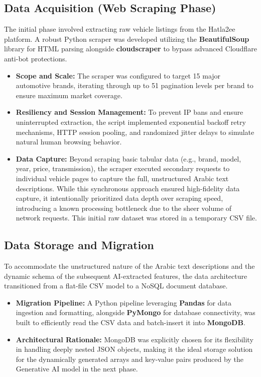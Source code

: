 \documentclass[12pt]{article}
\begin{document}
\subsection{Data Acquisition (Web Scraping Phase)}
The initial phase involved extracting raw vehicle listings from the Hatla2ee platform. A robust Python scraper was developed utilizing the \textbf{BeautifulSoup} library for HTML parsing alongside \textbf{cloudscraper} to bypass advanced Cloudflare anti-bot protections.
\begin{itemize}
    \item \textbf{Scope and Scale:} The scraper was configured to target 15 major automotive brands, iterating through up to 51 pagination levels per brand to ensure maximum market coverage.
    \item \textbf{Resiliency and Session Management:} To prevent IP bans and ensure uninterrupted extraction, the script implemented exponential backoff retry mechanisms, HTTP session pooling, and randomized jitter delays to simulate natural human browsing behavior.
    \item \textbf{Data Capture:} Beyond scraping basic tabular data (e.g., brand, model, year, price, transmission), the scraper executed secondary requests to individual vehicle pages to capture the full, unstructured Arabic text descriptions. While this synchronous approach ensured high-fidelity data capture, it intentionally prioritized data depth over scraping speed, introducing a known processing bottleneck due to the sheer volume of network requests. This initial raw dataset was stored in a temporary CSV file.
\end{itemize}

\newpage
\subsection{Data Storage and Migration}
To accommodate the unstructured nature of the Arabic text descriptions and the dynamic schema of the subsequent AI-extracted features, the data architecture transitioned from a flat-file CSV model to a NoSQL document database.
\begin{itemize}
    \item \textbf{Migration Pipeline:} A Python pipeline leveraging \textbf{Pandas} for data ingestion and formatting, alongside \textbf{PyMongo} for database connectivity, was built to efficiently read the CSV data and batch-insert it into \textbf{MongoDB}.
    \item \textbf{Architectural Rationale:} MongoDB was explicitly chosen for its flexibility in handling deeply nested JSON objects, making it the ideal storage solution for the dynamically generated arrays and key-value pairs produced by the Generative AI model in the next phase.
\end{itemize}
\end{document}

